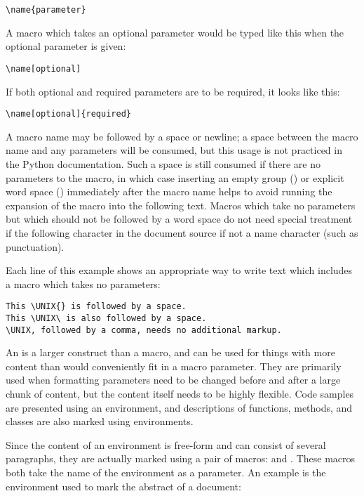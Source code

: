 \documentclass{howto}
\begin{document}
\begin{verbatim}
\name{parameter}
\end{verbatim}

    A macro which takes an optional parameter would be typed like this
    when the optional parameter is given:

\begin{verbatim}
\name[optional]
\end{verbatim}

    If both optional and required parameters are to be required, it
    looks like this:

\begin{verbatim}
\name[optional]{required}
\end{verbatim}

    A macro name may be followed by a space or newline; a space
    between the macro name and any parameters will be consumed, but
    this usage is not practiced in the Python documentation.  Such a
    space is still consumed if there are no parameters to the macro,
    in which case inserting an empty group (\code{\{\}}) or explicit
    word space (\samp{\e\ }) immediately after the macro name helps to
    avoid running the expansion of the macro into the following text.
    Macros which take no parameters but which should not be followed
    by a word space do not need special treatment if the following
    character in the document source if not a name character (such as
    punctuation).

    Each line of this example shows an appropriate way to write text
    which includes a macro which takes no parameters:

\begin{verbatim}
This \UNIX{} is followed by a space.
This \UNIX\ is also followed by a space.
\UNIX, followed by a comma, needs no additional markup.
\end{verbatim}

    An  is a larger construct than a macro, and can
    be used for things with more content than would conveniently fit
    in a macro parameter.  They are primarily used when formatting
    parameters need to be changed before and after a large chunk of
    content, but the content itself needs to be highly flexible.  Code
    samples are presented using an environment, and descriptions of
    functions, methods, and classes are also marked using environments.

    Since the content of an environment is free-form and can consist
    of several paragraphs, they are actually marked using a pair of
    macros:  and .  These macros both take the
    name of the environment as a parameter.  An example is the
    environment used to mark the abstract of a document:
\end{document}
